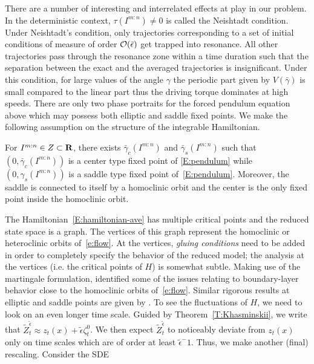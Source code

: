 There are a number of interesting and interrelated effects at play in our problem. In the deterministic context, $\tau (I^{m:n})\ne 0$ is called the Neishtadt condition. Under Neishtadt's condition, only trajectories corresponding to a set of initial conditions of measure of order ${\mathcal O (\bar \epsilon)}$ get trapped into resonance. All other trajectories pass through the resonance zone within a time duration such that the separation between the exact and the averaged trajectories is insignificant. Under this condition, for large values of the angle ${\gamma}$ the periodic part given by $V(\bar{\gamma})$ is small compared to the linear part thus the driving torque dominates at high speeds. There are only two phase portraits for the forced pendulum equation above which may possess both elliptic and saddle fixed points. We make the following assumption on the structure of the integrable Hamiltonian.
\begin{assumption}
For $I^{m:n} \in Z \subset \mathbf R$, there exists $\bar{\gamma}_c(I^{m:n})$ and $\bar{\gamma}_s(I^{m:n})$ such that
$(0,\bar{\gamma}_c(I^{m:n}))$ is a center type fixed point of \eqref{E:pendulum} while $(0,{\gamma}_s(I^{m:n}))$ is a saddle
type fixed point of~\eqref{E:pendulum}. Moreover, the saddle is connected to itself by a homoclinic orbit and the center is the only fixed point inside the homoclinic orbit.
\end{assumption}
The Hamiltonian~\eqref{E:hamiltonian-ave} has multiple critical points and the reduced state space is a graph. The vertices of this graph represent the homoclinic or heteroclinic orbits of~\eqref{e:flow}. At the vertices, \emph{gluing conditions} need to be added in order to completely specify the behavior of the reduced model; the analysis at the vertices (i.e. the critical points of $H$) is somewhat subtle. Making use of the martingale formulation, \citet{freidlin94:_random_pertur_of_hamil_system, freidlin98:_random_pertur_nonlin_oscil, sowers03:_stoch_averag_near_homoc_orbit} identified some of the issues relating to boundary-layer behavior close to the homoclinic orbits of~\eqref{e:flow}. Similar rigorous results at elliptic and saddle points are given by \citet{namachchivaya01:_unified_approac_noisy_nonlin_mathieu_type_system}.
To see the fluctuations of $H$, we need to look on an even longer time scale. Guided by Theorem~\ref{T:Khasminskii}, we write that $\tilde Z^{\tilde\epsilon}_t \approx z_t(x) + \tilde\epsilon \zeta^0_t$. We then expect $\tilde Z^{\tilde\epsilon}_t$ to noticeably deviate from $z_t(x)$ only on time scales which are of order at least $\tilde\epsilon^-1$. Thus, we make another (final) rescaling. Consider the SDE
